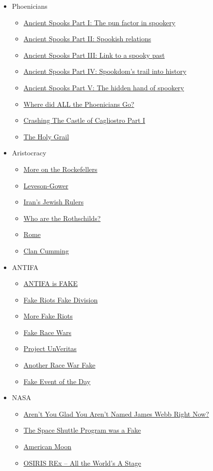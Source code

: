 \documentclass{article}
\newcommand{\insertmydocument}[2]{ %
  \item \href{http://www.mileswmathis.com/#2}{#1}
}
\begin{document}
\begin{itemize}
\begin{itemize}
\begin{itemize}
    \end{itemize}

    \item Phoenicians
    \begin{itemize}

      \insertmydocument{Ancient Spooks Part I: The pun factor in spookery}{phoen.pdf}
      \insertmydocument{Ancient Spooks Part II: Spookish relations}{phoen2.pdf}
      \insertmydocument{Ancient Spooks Part III: Link to a spooky past}{phoen3.pdf}
      \insertmydocument{Ancient Spooks Part IV: Spookdom’s trail into history}{phoen4.pdf}
      \insertmydocument{Ancient Spooks Part V: The hidden hand of spookery}{phoen5.pdf}
      \insertmydocument{Where did ALL the Phoenicians Go?}{phoenper.pdf}
      \insertmydocument{Crashing The Castle of Cagliostro Part I}{cagp1.pdf}
      \insertmydocument{The Holy Grail}{sangreal.pdf}

    \end{itemize}

    \item Aristocracy
    \begin{itemize}

      \insertmydocument{More on the Rockefellers}{rock2.pdf}
      \insertmydocument{Leveson-Gower}{levi.pdf}
      \insertmydocument{Iran’s Jewish Rulers}{iran.pdf}
      \insertmydocument{Who are the Rothschilds?}{rath.pdf}
      \insertmydocument{Rome}{caesar.pdf}
      \insertmydocument{Clan Cumming}{cumming.pdf}

    \end{itemize}

    \item ANTIFA
    \begin{itemize}

      \insertmydocument{ANTIFA is FAKE}{antifake.pdf}
      \insertmydocument{Fake Riots Fake Division}{live.pdf}
      \insertmydocument{More Fake Riots}{pepper.pdf}
      \insertmydocument{Fake Race Wars}{stage.pdf}
      \insertmydocument{Project UnVeritas}{unver.pdf}
      \insertmydocument{Another Race War Fake}{race.pdf}
      \insertmydocument{Fake Event of the Day}{antifake2.pdf}

    \end{itemize}

    \item NASA
    \begin{itemize}

      \insertmydocument{Aren't You Glad You Aren't Named James Webb Right Now?}{webb.pdf}
      \insertmydocument{The Space Shuttle Program was a Fake}{shut.pdf}
      \insertmydocument{American Moon}{ammoon.pdf}
      \insertmydocument{OSIRIS REx – All the World’s A Stage}{osiris.pdf}


\end{itemize}
\end{itemize}
\end{itemize}
\end{document}
